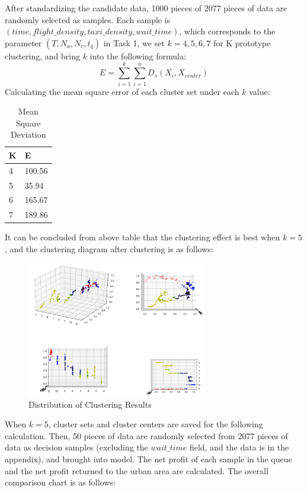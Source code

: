 After standardizing the candidate data, 1000 pieces of 2077 pieces of data are randomly selected as samples. Each sample is $(time, flight\_density, taxi\_density, wait\_time)$, which corresponds to the parameter $(T,{N}_a,{N}_c,{t}_q)$ in Task 1, we set $k = 4,5,6,7$ for K prototype clustering, and bring $k$  into the following formula:
\[E = \sum_{i=1}^{k} \sum_{i=1}^{n} {D}_s({X}_i,{X}_{center})\]
Calculating the mean square error of each cluster set under each $k$ value:
\begin{table}[H]
\caption{Mean Square Deviation}
\begin{center}
\begin{tabularx}{5cm}{p{2cm}|p{3cm}}
\hline
K & E  \\
\hline
4 & 100.56  \\
5 & 35.94 \\
6 & 165.67  \\
7 & 189.86 \\
\hline
\end{tabularx}
\end{center}
\end{table}
It can be concluded from above table that the clustering effect is  best when $k = 5$, and the clustering diagram after clustering is as follows:
\begin{figure}[H]
\centering
\includegraphics[width=0.7\textwidth]{figures/Q2_5.png}
\caption{Distribution of Clustering Results}
\label{fig:label}
\end{figure}
When $k = 5$, cluster sets and cluster centers are saved for the following calculation. Then, 50 pieces of data are randomly selected from 2077 pieces of data as decision samples (excluding the $wait\_time$ field, and the data is in the appendix), and brought into model. The net profit of each sample in the queue and the net profit returned to the urban area are calculated. The overall comparison chart is as follows:


